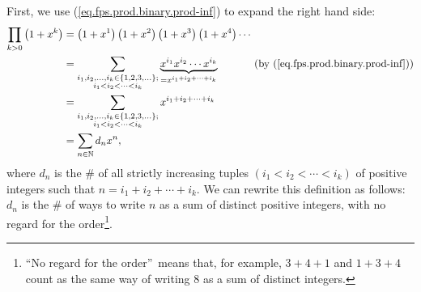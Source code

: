 First, we use (\ref{eq.fps.prod.binary.prod-inf}) to expand the right hand
side:%
\begin{align}
\prod_{k>0}\left(  1+x^{k}\right)   &  =\left(  1+x^{1}\right)  \left(
1+x^{2}\right)  \left(  1+x^{3}\right)  \left(  1+x^{4}\right)  \cdots
\nonumber\\
&  =\sum_{\substack{i_{1},i_{2},\ldots,i_{k}\in\left\{  1,2,3,\ldots\right\}
;\\i_{1}<i_{2}<\cdots<i_{k}}}\underbrace{x^{i_{1}}x^{i_{2}}\cdots x^{i_{k}}%
}_{=x^{i_{1}+i_{2}+\cdots+i_{k}}}\ \ \ \ \ \ \ \ \ \ \left(  \text{by
(\ref{eq.fps.prod.binary.prod-inf})}\right) \nonumber\\
&  =\sum_{\substack{i_{1},i_{2},\ldots,i_{k}\in\left\{  1,2,3,\ldots\right\}
;\\i_{1}<i_{2}<\cdots<i_{k}}}x^{i_{1}+i_{2}+\cdots+i_{k}}\nonumber\\
&  =\sum_{n\in\mathbb{N}}d_{n}x^{n}, \label{eq.prop.gf.prod.euler-odd.d}%
\end{align}
where $d_{n}$ is the \# of all strictly increasing tuples $\left(  i_{1}%
<i_{2}<\cdots<i_{k}\right)  $ of positive integers such that $n=i_{1}%
+i_{2}+\cdots+i_{k}$. We can rewrite this definition as follows: $d_{n}$ is
the \# of ways to write $n$ as a sum of distinct positive integers, with no
regard for the order\footnote{\textquotedblleft No regard for the
order\textquotedblright\ means that, for example, $3+4+1$ and $1+3+4$ count as
the same way of writing $8$ as a sum of distinct integers.}.


